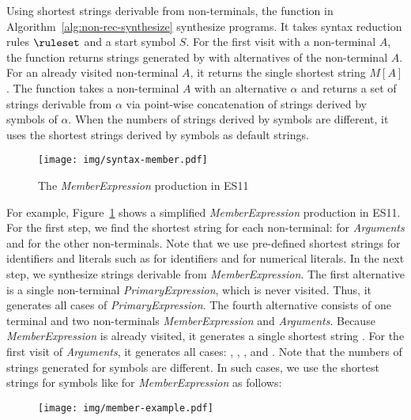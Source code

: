 Using shortest strings derivable from non-terminals, 
the  function in Algorithm~\ref{alg:non-rec-synthesize}
synthesize programs.  It takes syntax reduction rules $\ruleset$ and a start symbol $S$.
For the first visit with a non-terminal $A$, the  function returns
strings generated by  with alternatives of the non-terminal $A$.
For an already visited non-terminal $A$, it returns the single shortest string $M[A]$.
The  function takes a non-terminal $A$ with an alternative
$\alpha$ and returns a set of strings derivable from $\alpha$ via
point-wise concatenation of strings derived by symbols of $\alpha$.
When the numbers of strings derived by symbols are different,
it uses the shortest strings derived by symbols as default strings.

\begin{figure}[t]
  \centering
  \texttt{[image: img/syntax-member.pdf]}
  \caption{The \textit{MemberExpression} production in ES11}
  \label{fig:prod-example}
  \vspace*{-1em}
\end{figure}

For example, Figure~\ref{fig:prod-example} shows a simplified
\textit{MemberExpression} production in ES11.  For the first step, we find
the shortest string for each non-terminal: \code{()} for \textit{Arguments} and
 for the other non-terminals.  Note that we use pre-defined shortest
strings for identifiers and literals such as  for identifiers and
 for numerical literals.  In the next step, we synthesize strings
derivable from \textit{MemberExpression}.  The first alternative is a
single non-terminal \textit{PrimaryExpression}, which is never visited.
Thus, it generates all cases of \textit{PrimaryExpression}.  The fourth
alternative consists of one terminal  and two non-terminals
\textit{MemberExpression} and \textit{Arguments}.  Because \textit{MemberExpression}
is already visited, it generates a single shortest string .
For the first visit of \textit{Arguments}, it generates all cases:
\code{()}, , , and .
Note that the numbers of strings generated for symbols are different.
In such cases, we use the shortest strings for symbols like
 for \textit{MemberExpression} as follows:

\vspace*{-.5em}
\begin{figure}[H]
  \centering
  \texttt{[image: img/member-example.pdf]}
\end{figure}
\vspace*{-.5em}

